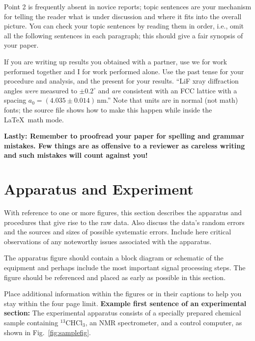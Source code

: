 Point 2 is frequently absent in novice reports; topic sentences are your
mechanism for telling the reader what is under discussion
and where it fits into the overall picture.
You can check your topic sentences by reading them in order, i.e.,
omit all the following sentences in each paragraph; this should
give a fair synopsis of your paper.

If you are writing up results you obtained with a partner,
use we for work performed together and I for work performed alone.
Use the past tense for your procedure and analysis,
and the present for your results. 
``LiF xray diffraction angles \emph{were} measured to
$\pm 0.2^\circ$ and \emph{are} consistent with an FCC lattice
with a spacing $a_0=(4.035\pm0.014)\,\mbox{nm}$.''
Note that units are in normal (not math) fonts; the source file
shows how to make this happen while inside the \LaTeX\ math mode.

\textbf{Lastly: Remember to proofread your paper for spelling and grammar
 mistakes.  Few things are as offensive to a reviewer as careless
 writing and such mistakes will count against you!}

\section{Apparatus and Experiment}

With reference to one or more figures, this section describes the apparatus
and procedures that give rise to the raw data.  Also discuss the data's 
random errors and the sources and sizes of possible systematic errors.
Include here critical observations of any noteworthy issues associated with the apparatus.

The apparatus figure should contain a block diagram or schematic of the equipment and perhaps
include the most important signal processing steps.
The figure should be referenced and placed as early as possible in this section.

Place additional information within the figures or in their captions
to help you stay within the four page limit.
\textbf{Example first sentence of an experimental section:}
The experimental apparatus consists of a specially prepared chemical
sample containing $^{13}$CHCl$_3$, an NMR spectrometer, and a control
computer, as shown in Fig.~\ref{fig:samplefig}.

%
%

